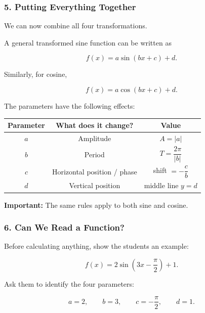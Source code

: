 \documentclass[a4paper,11pt]{article}
\begin{document}
\subsubsection*{5. Putting Everything Together}

We can now combine all four transformations.

A general transformed sine function can be written as

\begin{equation}
    \boxed{
    f(x)=a\sin(bx+c)+d
    }.
\end{equation}

Similarly, for cosine,

\begin{equation}
    \boxed{
    f(x)=a\cos(bx+c)+d
    }.
\end{equation}

The parameters have the following effects:

\begin{center}
\begin{tabular}{c|c|c}
\textbf{Parameter} & \textbf{What does it change?} & \textbf{Value} \\ \hline
$a$ & Amplitude & $A=|a|$ \\[2mm]
$b$ & Period & $T=\dfrac{2\pi}{|b|}$ \\[3mm]
$c$ & Horizontal position / phase & shift $=-\dfrac{c}{b}$ \\[3mm]
$d$ & Vertical position & middle line $y=d$
\end{tabular}
\end{center}

\textbf{Important:} The same rules apply to both sine and cosine.


\subsubsection*{6. Can We Read a Function?}

Before calculating anything, show the students an example:

\begin{equation}
    f(x)=2\sin\left(3x-\frac{\pi}{2}\right)+1.
\end{equation}

Ask them to identify the four parameters:

\begin{equation}
    a=2,
    \qquad
    b=3,
    \qquad
    c=-\frac{\pi}{2},
    \qquad
    d=1.
\end{equation}
\end{document}
